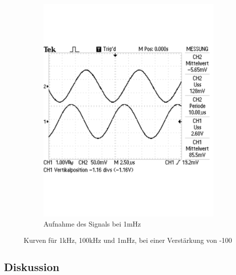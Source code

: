 \documentclass[12pt,a4paper]{article}
\begin{document}
\begin{figure}[H]
\begin{subfigure}[b]{0.28\textwidth}
                \includegraphics[width=\textwidth , scale = 0.4]{2_4_100_1m.pdf}
                \caption[Aufnahme des Signals bei 1mHz]{Aufnahme des Signals bei 1mHz}
  				\label{fig:2_4_100_1m}
        \end{subfigure}
        \caption{Kurven für 1kHz, 100kHz und 1mHz, bei einer Verstärkung von -100}
        \label{fig:2_4_100}
\end{figure}



\subsection{Diskussion}
\end{document}
